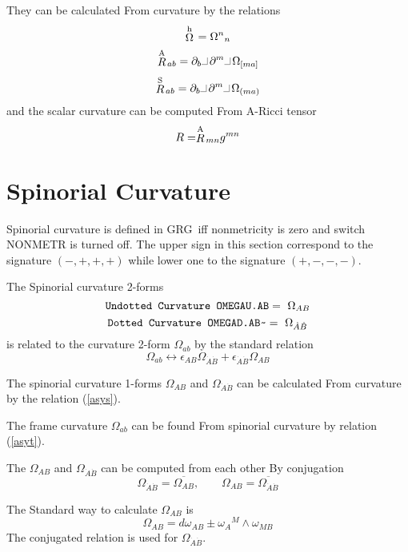 \documentclass[twoside,openright]{report}
\newcommand{\grgtt}{\ttfamily}
\newcommand{\object}[2]{%
\begin{equation}
\mbox{\comm{#1}} =\ #2
\end{equation}}
\newcommand{\tsst}{\longleftrightarrow}
\newcommand{\RR}[1]{\stackrel{\rm #1}{R}\!{}}
\newcommand{\OO}[1]{\stackrel{\rm #1}{\Omega}\!{}}
\newcommand{\ipr}{\rule{1.8mm}{.1mm}\rule{.1mm}{2.2mm}\,} %
\renewcommand{\tt}{\grgtt}
\newcommand{\cc}{{\tt \char'176}}           %
\newcommand{\grg}{{\sc GRG}}
\newcommand{\comm}[1]{{\upshape\tt#1}}    %
\begin{document}
They can be calculated {\tt From curvature} by the
relations
\begin{equation}
\OO{h}=\Omega^n{}_n
\end{equation}
\begin{equation}
\RR{A}_{ab}= \partial_b\ipr\partial^m\ipr\Omega_{[ma]}
\end{equation}
\begin{equation}
\RR{S}_{ab}= \partial_b\ipr\partial^m\ipr\Omega_{(ma)}
\end{equation}
and the scalar curvature can be computed {\tt From A-Ricci tensor}
\begin{equation}
R = \RR{A}_{mn}g^{mn}
\end{equation}


\section{Spinorial Curvature}

Spinorial curvature is defined in \grg\ iff nonmetricity
is zero and switch \comm{NONMETR} is turned off.
The upper sign in this section correspond to the signature
${\scriptstyle(-,+,+,+)}$ while lower one to the signature
${\scriptstyle(+,-,-,-)}$.

The {\tt Spinorial curvature} 2-forms
\object{Undotted Curvature OMEGAU.AB}{\Omega_{AB}}
\object{Dotted Curvature OMEGAD.AB\cc}{\Omega_{\dot A\dot B}}
is related to the curvature 2-form $\Omega_{ab}$ by the standard
relation
\begin{equation}
\Omega_{ab} \tsst
\epsilon_{AB} \Omega_{\dot A\dot B}
+ \epsilon_{\dot A\dot B} \Omega_{AB}
\end{equation}

The spinorial curvature 1-forms
$\Omega_{AB}$ and $\Omega_{\dot A\dot B}$
can be calculated {\tt From curvature} by the
relation (\ref{asys}).

The frame curvature $\Omega_{ab}$ can be
found {\tt From spinorial curvature} by relation (\ref{asyt}).

The $\Omega_{AB}$ and $\Omega_{\dot A\dot B}$ can be
computed from each other {\tt By conjugation}
\begin{equation}
\Omega_{\dot A\dot B}=\overline{\Omega_{AB}},\qquad
\Omega_{AB}=\overline{\Omega_{\dot A\dot B}}
\end{equation}

The {\tt Standard way} to calculate $\Omega_{AB}$ is
\begin{equation}
\Omega_{AB} = d\omega_{AB} \pm \omega_A{}^M\wedge\omega_{MB}
\end{equation}
The conjugated relation is used for $\Omega_{\dot A\dot B}$.
\end{document}
